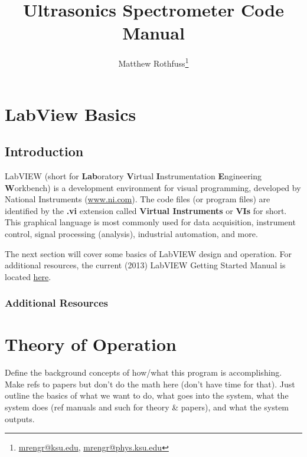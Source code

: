 \documentclass[11pt,a4paper,oldfontcommands]{memoir}
\begin{document}
\title{Ultrasonics Spectrometer Code Manual}
\author{Matthew Rothfuss\thanks{\href{mailto:mrengr@ksu.edu}{mrengr@ksu.edu}, \href{mailto:mrengr@phys.ksu.edu}{mrengr@phys.ksu.edu}}}

\maketitle
\newpage
\tableofcontents
\newpage
\listoffigures
\listoftables

\chapter{LabView Basics}

\section{Introduction}

LabVIEW	(short	for	\textbf{Lab}oratory	\textbf{V}irtual	\textbf{I}nstrumentation	\textbf{E}ngineering	\textbf{W}orkbench) is a development environment for visual programming, developed by National Instruments (\href{http://www.ni.com/}{www.ni.com}). The code files (or program files) are identified by the \textbf{.vi} extension called \textbf{Virtual Instruments} or \textbf{VIs} for short. This graphical language is most commonly used for data acquisition, instrument control, signal processing (analysis), industrial automation, and more.

The next section will cover some basics of LabVIEW design and operation. For additional resources, the current (2013) LabVIEW Getting Started Manual is located \href{http://www.ni.com/pdf/manuals/373427j.pdf}{here}.

\subsection{Additional Resources}

\cite{gomez_alvarez-arenas_air-coupled_2003}

\chapter{Theory of Operation}

Define the background concepts of how/what this program is accomplishing.  Make refs to papers but don't do the math here (don't have time for that).  Just outline the basics of what we want to do, what goes into the system, what the system does (ref manuals and such for theory \& papers), and what the system outputs.
\end{document}

